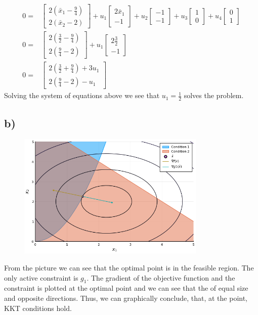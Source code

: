\documentclass{article}
\begin{document}
	\begin{align}
		0 = & \begin{bmatrix} 2(\bar{x}_1 -\frac{9}{4}) \\ 2(\bar{x}_2 -2)\end{bmatrix} + u_1 \begin{bmatrix} 2\bar{x}_1 \\ -1 \end{bmatrix} + u_2 \begin{bmatrix} -1 \\ -1 \end{bmatrix} + u_3 \begin{bmatrix} 1 \\ 0 \end{bmatrix} + u_4 \begin{bmatrix} 0 \\ 1 \end{bmatrix}\\
		0 = & \begin{bmatrix} 2(\frac{3}{2} -\frac{9}{4}) \\ 2(\frac{9}{4} -2)\end{bmatrix} + u_1 \begin{bmatrix} 2\frac{3}{2} \\ -1 \end{bmatrix} \\
		0 = & \begin{bmatrix}2(\frac{3}{2} +\frac{9}{4}) +3u_1 \\ 2(\frac{9}{4} -2) -u_1
		\end{bmatrix}
	\end{align}
	Solving the system of equations above we see that $u_1 = \frac{1}{2}$ solves the problem.
\subsection*{b)}
	\begin{figure}[H]
		\includegraphics[width=0.8\textwidth]{3_2.png}
		\caption{}
		\label{fig:2a}
	\end{figure}
	From the picture we can see that the optimal point is in the feasible region. The only active constraint is $g_1$. The gradient of the objective function and the constraint is plotted at the optimal point and we can see that the of equal size and opposite directions. Thus, we can graphically conclude, that, at the point, KKT conditions hold.
\end{document}
